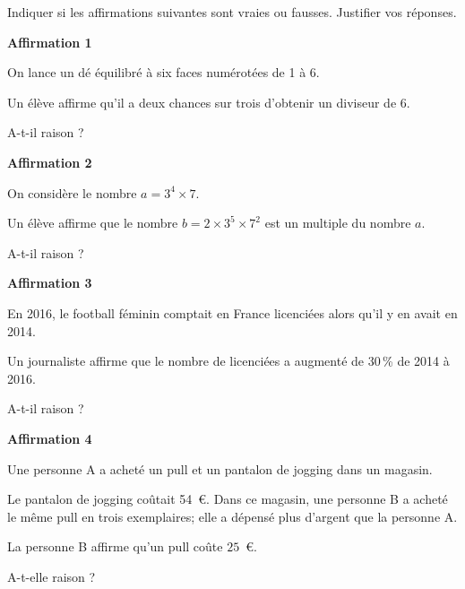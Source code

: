 
\medskip

Indiquer si les affirmations suivantes sont vraies ou fausses. Justifier vos réponses.

\medskip

\textbf{Affirmation 1}

\smallskip

On lance un dé équilibré à six faces numérotées de 1 à 6.

Un élève affirme qu'il a deux chances sur trois d'obtenir un diviseur de 6.

A-t-il raison ?

\medskip

\textbf{Affirmation 2}

\smallskip

On considère le nombre $a = 3^4 \times 7$.

Un élève affirme que le nombre $b = 2 \times 3^5 \times 7^2$ est un multiple du nombre $a$.

A-t-il raison ?

\medskip

\textbf{Affirmation 3}

\smallskip

En 2016, le football féminin comptait en France  licenciées alors qu'il y en avait  en 2014.

Un journaliste affirme que le nombre de licenciées a augmenté de $30$\,\% de 2014 à
2016.

A-t-il raison ?

\medskip

\textbf{Affirmation 4}

\smallskip

Une personne A a acheté un pull et un pantalon de jogging dans un magasin.

Le pantalon de jogging coûtait 54~\euro. Dans ce magasin, une personne B a acheté le
même pull en trois exemplaires; elle a dépensé plus d'argent que la personne A.

La personne B affirme qu'un pull coûte $25$~\euro.

A-t-elle raison ?

\bigskip

